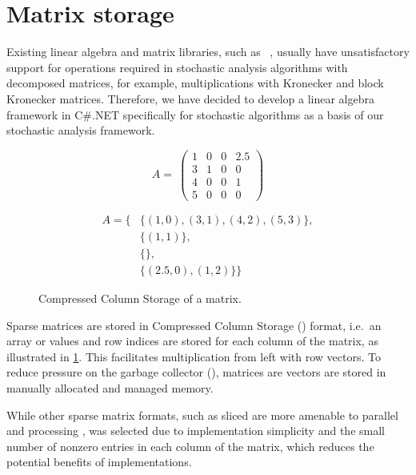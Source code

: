 \section{Matrix storage}

Existing linear algebra and matrix libraries, such as%
~\citep{mathdotnet,bluebit,extremeopt,eigen,sanderson2010armadillo},
usually have unsatisfactory support for operations required in
stochastic analysis algorithms with decomposed matrices, for example,
multiplications with Kronecker and block Kronecker
matrices. Therefore, we have decided to develop a linear algebra
framework in C\#.NET specifically for stochastic
algorithms as a basis of our stochastic analysis framework.

\begin{figure}
  \centering
  \begin{minipage}{0.5\linewidth}
    \begin{equation}
      A = \
      \begin{pmatrix}
        1 & 0 & 0 & 2.5 \\
        3 & 1 & 0 & 0 \\
        4 & 0 & 0 & 1 \\
        5 & 0 & 0 & 0
      \end{pmatrix}
    \end{equation}
  \end{minipage}%
  \begin{minipage}{0.5\linewidth}
    \begin{align}
      A = \{&\{(1,0), (3,1), (4,2), (5,3)\}, \\
      &\{(1,1)\}, \\
      &\{\}, \\
      &\{(2.5,0), (1,2)\}\}
    \end{align}
  \end{minipage}
  \caption{Compressed Column Storage of a matrix.}
  \label{fig:genstor:matrix:ccs}
\end{figure}

Sparse matrices are stored in Compressed Column Storage ()
format, i.e.~an array or values and row indices are stored for each
column of the matrix, as illustrated in
\cref{fig:genstor:matrix:ccs}. This facilitates multiplication from
left with row vectors. To reduce pressure on the garbage collector
(\textls{GC}), matrices are vectors are stored in manually allocated
and managed memory.

While other sparse matrix formats, such as sliced  are
more amenable to parallel and \textls{SIMD} processing
\citet{DBLP:journals/corr/KreutzerHWFB13},  was selected
due to implementation simplicity and the small number of nonzero
entries in each column of the matrix, which reduces the potential
benefits of \textls{SIMD} implementations.

